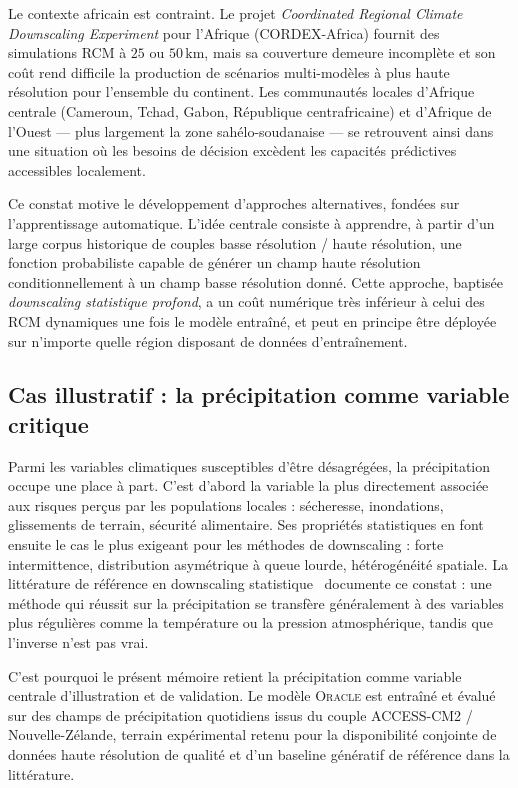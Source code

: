 \documentclass[14pt,a4paper,openany]{extreport}
\theoremstyle{definition}
\newcommand{\Oracle}{\textsc{Oracle}}
\begin{document}
Le contexte africain est contraint. Le projet \emph{Coordinated Regional Climate Downscaling Experiment} pour l'Afrique (CORDEX-Africa) fournit des simulations RCM à $25$ ou $50\,\mathrm{km}$, mais sa couverture demeure incomplète et son coût rend difficile la production de scénarios multi-modèles à plus haute résolution pour l'ensemble du continent. Les communautés locales d'Afrique centrale (Cameroun, Tchad, Gabon, République centrafricaine) et d'Afrique de l'Ouest --- plus largement la zone sahélo-soudanaise --- se retrouvent ainsi dans une situation où les besoins de décision excèdent les capacités prédictives accessibles localement.

Ce constat motive le développement d'approches alternatives, fondées sur l'apprentissage automatique. L'idée centrale consiste à apprendre, à partir d'un large corpus historique de couples basse résolution / haute résolution, une fonction probabiliste capable de générer un champ haute résolution conditionnellement à un champ basse résolution donné. Cette approche, baptisée \emph{downscaling statistique profond}, a un coût numérique très inférieur à celui des RCM dynamiques une fois le modèle entraîné, et peut en principe être déployée sur n'importe quelle région disposant de données d'entraînement.

\subsection{Cas illustratif : la précipitation comme variable critique}
\label{ssec:cas-precipitation}

Parmi les variables climatiques susceptibles d'être désagrégées, la précipitation occupe une place à part. C'est d'abord la variable la plus directement associée aux risques perçus par les populations locales : sécheresse, inondations, glissements de terrain, sécurité alimentaire. Ses propriétés statistiques en font ensuite le cas le plus exigeant pour les méthodes de downscaling : forte intermittence, distribution asymétrique à queue lourde, hétérogénéité spatiale. La littérature de référence en downscaling statistique~\cite{maraun_widmann_2018,vandal_deepsd_2017} documente ce constat : une méthode qui réussit sur la précipitation se transfère généralement à des variables plus régulières comme la température ou la pression atmosphérique, tandis que l'inverse n'est pas vrai.

C'est pourquoi le présent mémoire retient la précipitation comme variable centrale d'illustration et de validation. Le modèle \Oracle{} est entraîné et évalué sur des champs de précipitation quotidiens issus du couple ACCESS-CM2 / Nouvelle-Zélande, terrain expérimental retenu pour la disponibilité conjointe de données haute résolution de qualité et d'un baseline génératif de référence dans la littérature.
\end{document}

